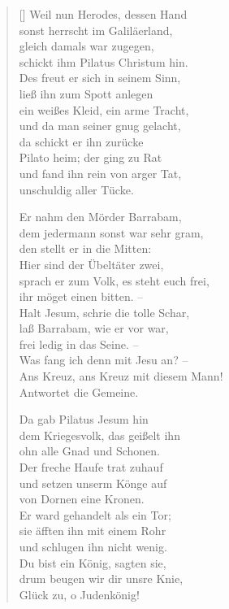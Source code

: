 \begin{multicols}{2}
\begin{verse}[\versewidth]
 Weil nun Herodes, dessen Hand\\
sonst herrscht im Galiläerland,\\
gleich damals war zugegen,\\
schickt ihm Pilatus Christum hin.\\
Des freut er sich in seinem Sinn,\\
ließ ihn zum Spott anlegen\\
ein weißes Kleid, ein arme Tracht,\\
und da man seiner gnug gelacht,\\
da schickt er ihn zurücke\\
Pilato heim; der ging zu Rat\\
und fand ihn rein von arger Tat,\\
unschuldig aller Tücke.

 Er nahm den Mörder Barrabam,\\
dem jedermann sonst war sehr gram,\\
den stellt er in die Mitten:\\
Hier sind der Übeltäter zwei,\\
sprach er zum Volk, es steht euch frei,\\
ihr möget einen bitten. –\\
Halt Jesum, schrie die tolle Schar,\\
laß Barrabam, wie er vor war,\\
frei ledig in das Seine. –\\
Was fang ich denn mit Jesu an? –\\
Ans Kreuz, ans Kreuz mit diesem Mann!\\
Antwortet die Gemeine.

 Da gab Pilatus Jesum hin\\
dem Kriegesvolk, das geißelt ihn\\
ohn alle Gnad und Schonen.\\
Der freche Haufe trat zuhauf\\
und setzen unserm Könge auf\\
von Dornen eine Kronen.\\
Er ward gehandelt als ein Tor;\\
sie äfften ihn mit einem Rohr\\
und schlugen ihn nicht wenig.\\
Du bist ein König, sagten sie,\\
drum beugen wir dir unsre Knie,\\
Glück zu, o Judenkönig!


\end{verse}
\end{multicols}
